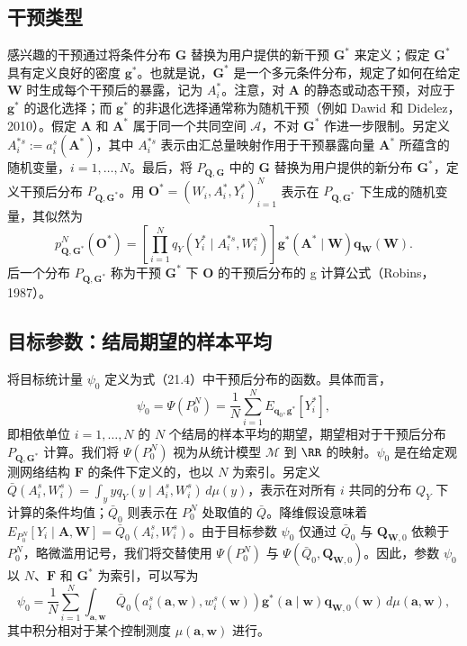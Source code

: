 \subsection{干预类型}

感兴趣的干预通过将条件分布 $\bm G$ 替换为用户提供的新干预 $\bm G^*$ 来定义；假定 $\bm G^*$ 具有定义良好的密度 $\bm g^*$。也就是说，$\bm G^*$ 是一个多元条件分布，规定了如何在给定 $\bm W$ 时生成每个干预后的暴露，记为 $A_i^*$。注意，对 $\bm A$ 的静态或动态干预，对应于 $\bm g^*$ 的退化选择；而 $\bm g^*$ 的非退化选择通常称为随机干预（例如 Dawid 和 Didelez，2010）。假定 $\bm A$ 和 $\bm A^*$ 属于同一个共同空间 $\mathcal A$，不对 $\bm G^*$ 作进一步限制。另定义 $A_i^{*s}:=a_i^s(\bm A^*)$，其中 $A_i^{*s}$ 表示由汇总量映射作用于干预暴露向量 $\bm A^*$ 所蕴含的随机变量，$i=1,\ldots,N$。最后，将 $P_{\bm Q,\bm G}$ 中的 $\bm G$ 替换为用户提供的新分布 $\bm G^*$，定义干预后分布 $P_{\bm Q,\bm G^*}$。用 $\bm O^*=(W_i,A_i^*,Y_i^*)_{i=1}^N$ 表示在 $P_{\bm Q,\bm G^*}$ 下生成的随机变量，其似然为
\begin{equation}
 p_{\bm Q,\bm G^*}^N(\bm O^*)
 =\left[\prod_{i=1}^N q_Y(Y_i^*\mid A_i^{*s},W_i^s)\right]
  \bm g^*(\bm A^*\mid\bm W)\bm q_{\bm W}(\bm W).
 \tag{21.4}
\end{equation}
后一个分布 $P_{\bm Q,\bm G^*}$ 称为干预 $\bm G^*$ 下 $\bm O$ 的干预后分布的 g 计算公式（Robins，1987）。

\subsection{目标参数：结局期望的样本平均}

将目标统计量 $\psi_0$ 定义为式（21.4）中干预后分布的函数。具体而言，
\begin{equation}
 \psi_0=\Psi(P_0^N)
 =\frac{1}{N}\sum_{i=1}^N E_{\bm q_0,\bm g^*}[Y_i^*],
 \tag{21.5}
\end{equation}
即相依单位 $i=1,\ldots,N$ 的 $N$ 个结局的样本平均的期望，期望相对于干预后分布 $P_{\bm Q,\bm G^*}$ 计算。我们将 $\Psi(P_0^N)$ 视为从统计模型 $\mathcal M$ 到 $\RR$ 的映射。$\psi_0$ 是在给定观测网络结构 $\bm F$ 的条件下定义的，也以 $N$ 为索引。另定义 $\bar Q(A_i^s,W_i^s)=\int_y yq_Y(y\mid A_i^s,W_i^s)\,d\mu(y)$，表示在对所有 $i$ 共同的分布 $Q_Y$ 下计算的条件均值；$\bar Q_0$ 则表示在 $P_0^N$ 处取值的 $\bar Q$。降维假设意味着 $E_{P_0^N}[Y_i\mid\bm A,\bm W]=\bar Q_0(A_i^s,W_i^s)$。由于目标参数 $\psi_0$ 仅通过 $\bar Q_0$ 与 $\bm Q_{\bm W,0}$ 依赖于 $P_0^N$，略微滥用记号，我们将交替使用 $\Psi(P_0^N)$ 与 $\Psi(\bar Q_0,\bm Q_{\bm W,0})$。因此，参数 $\psi_0$ 以 $N$、$\bm F$ 和 $\bm G^*$ 为索引，可以写为
\begin{equation}
 \psi_0=\frac{1}{N}\sum_{i=1}^N\int_{\bm a,\bm w}
 \bar Q_0(a_i^s(\bm a,\bm w),w_i^s(\bm w))
 \bm g^*(\bm a\mid\bm w)\bm q_{\bm W,0}(\bm w)\,d\mu(\bm a,\bm w),
 \tag{21.6}
\end{equation}
其中积分相对于某个控制测度 $\mu(\bm a,\bm w)$ 进行。

